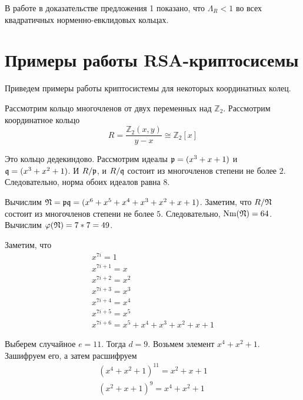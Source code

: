\documentclass[_00_dissertation.tex]{subfiles}
\begin{document}
\begin{remark}
    В работе \cite{source:Vaskouski_CSIST} в доказательстве предложения 1 показано, что $\Lambda_{R} < 1$ во всех квадратичных норменно-евклидовых кольцах.
\end{remark}

\section{Примеры работы RSA-криптосисемы}

Приведем примеры работы криптосистемы для некоторых координатных колец.

\begin{example}
	Рассмотрим кольцо многочленов от двух переменных над $\mathbb{Z}_2$.
	Рассмотрим координатное кольцо
	\begin{equation*}
		R = \frac{\mathbb{Z}_2(x, y)}{y-x} \cong \mathbb{Z}_2[x]
	\end{equation*}
	
	Это кольцо дедекиндово.
	Рассмотрим идеалы $\mathfrak{p} = (x^3 + x + 1)$ и $\mathfrak{q} = (x^3 + x^2 + 1)$.
	И $R/\mathfrak{p}$, и $R/\mathfrak{q}$ состоит из многочленов степени не более $2$.
	Следовательно, норма обоих идеалов равна $8$.
	
	Вычислим $\mathfrak{N} = \mathfrak{p}\mathfrak{q} = (x^6 + x^5 + x^4 + x^3 + x^2 + x + 1)$.
	Заметим, что $R/\mathfrak{N}$ состоит из многочленов степени не более $5$.
	Следовательно, $\textrm{Nm}(\mathfrak{N}) = 64$.
	Вычислим $\varphi(\mathfrak{N}) = 7 * 7 = 49$.

	Заметим, что
	\begin{equation*}
		\begin{array}{l}
			x^{7i} = 1\\
			x^{7i+1} = x\\
			x^{7i+2} = x^2\\
			x^{7i+3} = x^3\\
			x^{7i+4} = x^4\\
			x^{7i+5} = x^5\\
			x^{7i+6} = x^5 + x^4 + x^3 + x^2 + x + 1
		\end{array}
	\end{equation*}

	Выберем случайное $e = 11$.
	Тогда $d = 9$.
	Возьмем элемент $x^4 + x^2 + 1$.
	Зашифруем его, а затем расшифруем
	\begin{equation*}
	    \begin{split}
    		(x^4 + x^2 + 1)^{11} = x^2 + x + 1\\
    		(x^2 + x + 1)^{9} = x^4 + x^2 + 1
	    \end{split}
	\end{equation*}
\end{example}
\end{document}

